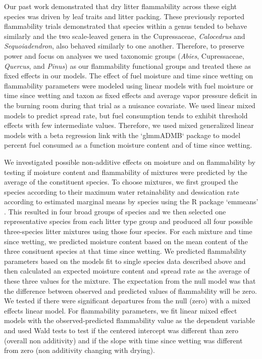 \documentclass[fire,article,submit,moreauthors,pdftex]{Definitions/mdpi}
\begin{document}
Our past work \cite{Magalhaes+Schwilk-2012} demonstrated that dry litter
flammability across these eight species was driven by leaf traits and litter
packing. These previously reported flammability trials demonstrated that species within a genus tended to behave similarly and the two scale-leaved genera in the Cupressaceae,
\emph{Calocedrus} and \emph{Sequoiadendron}, also behaved similarly to one
another. Therefore, to preserve power and focus on analyses we used taxonomic groups (\emph{Abies}, Cupressaceae, \emph{Quercus}, and \emph{Pinus}) as our flammability functional groups and treated these as fixed effects in our models. The effect of fuel moisture and
time since wetting on flammability parameters were modeled using linear
models with fuel moisture or time since wetting and taxon as fixed effects and
average vapor pressure deficit in the burning room during that trial as a
nuisance covariate. We used linear mixed models to predict spread rate, but
fuel consumption tends to exhibit threshold effects with few intermediate
values. Therefore, we used mixed generalized linear models with a beta
regression link with the `glmmADMB` package \cite{Skaug_Fournier_etal-2016} to
model percent fuel consumed as a function moisture content and of time since
wetting.

We investigated possible non-additive effects on moisture and on flammability
by testing if moisture content and flammability of mixtures were predicted by
the average of the constituent species. To choose mixtures, we first grouped the
species according to their maximum water retainability and dessication rate
according to estimated marginal means by species using the R package `emmeans'
\cite{Lenth-2019}. This resulted in four broad groups of species and we then
selected one representative species from each litter type group and produced
all four possible three-species litter mixtures using those four species. For
each mixture and time since wetting, we predicted moisture content based on the
mean content of the three consituent species at that time since wetting. We
predicted flammability parameters based on the models fit to single species
data described above and then calculated an expected moisture content and
spread rate as the average of these three values for the mixture. The
expectation from the null model was that the difference between observed and
predicted values of flammability will be zero. We tested if there were
significant departures from the null (zero) with a mixed effects linear model.
For flammability parameters, we fit linear mixed effect models with the
observed-predicted flammability value as the dependent variable and used Wald
tests to test if the centered intercept was different than zero (overall non
additivity) and if the slope with time since wetting was different from zero
(non additivity changing with drying).
\end{document}
